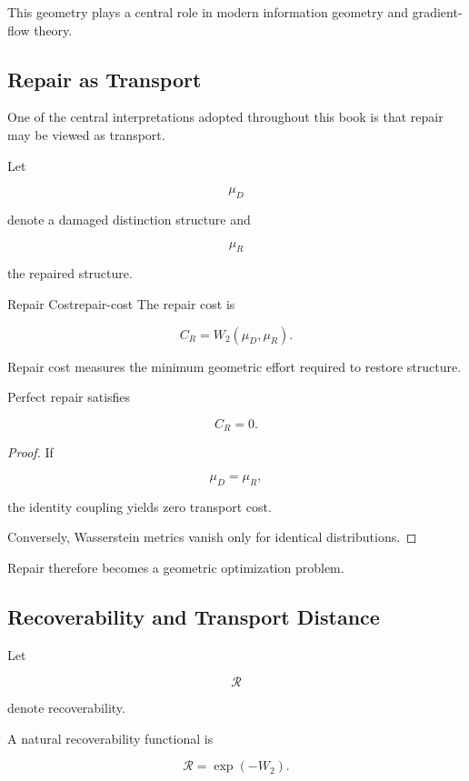 \documentclass[12pt,twoside,openright]{book}
\newenvironment{prop}
{\begin{proposition}{}{}}
{\end{proposition}}
\begin{document}
This geometry plays a central role in modern information
geometry and gradient-flow theory.

\subsection{Repair as Transport}

One of the central interpretations adopted throughout this
book is that repair may be viewed as transport.

Let

\[
\mu_D
\]

denote a damaged distinction structure and

\[
\mu_R
\]

the repaired structure.

\begin{definition}{Repair Cost}{repair-cost}
The repair cost is

\[
C_R
=

W_2(\mu_D,\mu_R).
\]
\end{definition}

Repair cost measures the minimum geometric effort
required to restore structure.

\begin{prop}
Perfect repair satisfies

\[
C_R=0.
\]
\end{prop}

\begin{proof}
If

\[
\mu_D=\mu_R,
\]

the identity coupling yields zero transport cost.

Conversely, Wasserstein metrics vanish only for identical
distributions.
\end{proof}

Repair therefore becomes a geometric optimization problem.

\subsection{Recoverability and Transport Distance}

Let

\[
\mathcal R
\]

denote recoverability.

A natural recoverability functional is

\[
\mathcal R
=

\exp(-W_2).
\]
\end{document}
